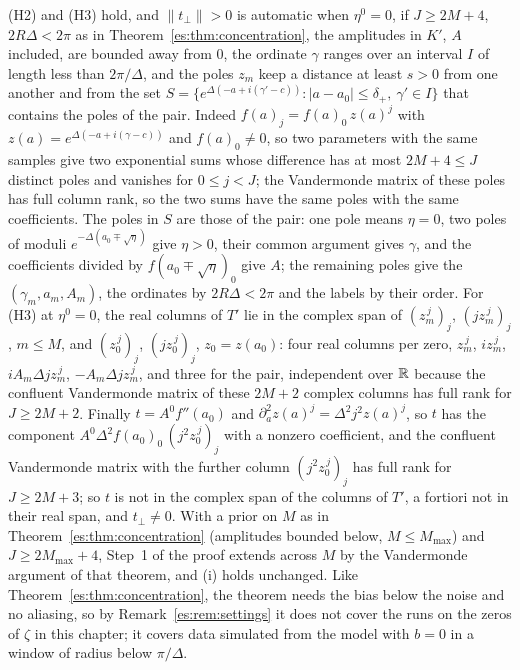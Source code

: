 \begin{remark}\label{es:rem:singular}
(H2) and (H3) hold, and $\|t_\perp\|>0$ is automatic when $\eta^0=0$, if $J\ge2M+4$, $2R\Delta<2\pi$ as in Theorem~\ref{es:thm:concentration}, the amplitudes in $K'$, $A$ included, are bounded away from $0$, the ordinate $\gamma$ ranges over an interval $I$ of length less than $2\pi/\Delta$, and the poles $z_m$ keep a distance at least $s>0$ from one another and from the set $S=\{e^{\Delta(-a+i(\gamma'-c))}:|a-a_0|\le\delta_+,\ \gamma'\in I\}$ that contains the poles of the pair. Indeed $f(a)_j=f(a)_0\,z(a)^j$ with $z(a)=e^{\Delta(-a+i(\gamma-c))}$ and $f(a)_0\ne0$, so two parameters with the same samples give two exponential sums whose difference has at most $2M+4\le J$ distinct poles and vanishes for $0\le j<J$; the Vandermonde matrix of these poles has full column rank, so the two sums have the same poles with the same coefficients. The poles in $S$ are those of the pair: one pole means $\eta=0$, two poles of moduli $e^{-\Delta(a_0\mp\sqrt\eta)}$ give $\eta>0$, their common argument gives $\gamma$, and the coefficients divided by $f(a_0\mp\sqrt\eta)_0$ give $A$; the remaining poles give the $(\gamma_m,a_m,A_m)$, the ordinates by $2R\Delta<2\pi$ and the labels by their order. For (H3) at $\eta^0=0$, the real columns of $T'$ lie in the complex span of $(z_m^{\,j})_j$, $(jz_m^{\,j})_j$, $m\le M$, and $(z_0^{\,j})_j$, $(jz_0^{\,j})_j$, $z_0=z(a_0)$: four real columns per zero, $z_m^{\,j}$, $iz_m^{\,j}$, $iA_m\Delta jz_m^{\,j}$, $-A_m\Delta jz_m^{\,j}$, and three for the pair, independent over $\mathbb{R}$ because the confluent Vandermonde matrix of these $2M+2$ complex columns has full rank for $J\ge2M+2$. Finally $t=A^0f''(a_0)$ and $\partial_a^2z(a)^j=\Delta^2j^2z(a)^j$, so $t$ has the component $A^0\Delta^2f(a_0)_0\,(j^2z_0^{\,j})_j$ with a nonzero coefficient, and the confluent Vandermonde matrix with the further column $(j^2z_0^{\,j})_j$ has full rank for $J\ge2M+3$; so $t$ is not in the complex span of the columns of $T'$, a fortiori not in their real span, and $t_\perp\ne0$. With a prior on $M$ as in Theorem~\ref{es:thm:concentration} (amplitudes bounded below, $M\le M_{\max}$) and $J\ge2M_{\max}+4$, Step~1 of the proof extends across $M$ by the Vandermonde argument of that theorem, and (i) holds unchanged. Like Theorem~\ref{es:thm:concentration}, the theorem needs the bias below the noise and no aliasing, so by Remark~\ref{es:rem:settings} it does not cover the runs on the zeros of $\zeta$ in this chapter; it covers data simulated from the model with $b=0$ in a window of radius below $\pi/\Delta$.
\end{remark}

